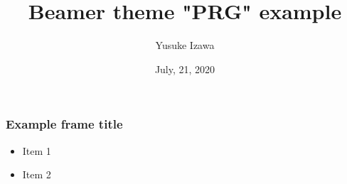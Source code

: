 \documentclass{beamer}
\title{Beamer theme "PRG" example}
\author{Yusuke Izawa}
\date{July, 21, 2020}
\begin{document}
\frame{\maketitle}

\begin{frame}
  \frametitle{Example frame title}

  \begin{itemize}
    \item Item 1
    \item Item 2
  \end{itemize}
\end{frame}
\end{document}
